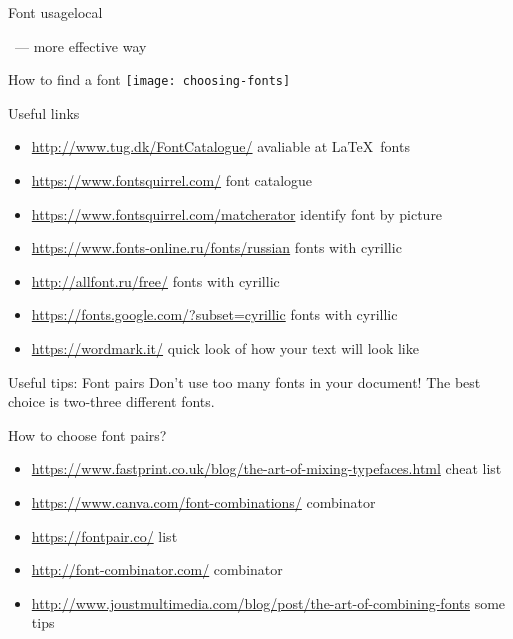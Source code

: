 \begin{frame}[fragile]{Font usage\magicPage}{local}\relax

\ccol\newfontfamily\ --- more effective way


\end{frame}

\begin{frame}{How to find a font}\relax
\centering
     \texttt{[image: choosing-fonts]}
     
\end{frame}

\begin{frame}{Useful links}\relax
\begin{itemize}
    \item {\csk \url{http://www.tug.dk/FontCatalogue/}} avaliable at \LaTeX\ fonts 
    \item {\csk \url{https://www.fontsquirrel.com/}} font catalogue 
    \item {\csk \url{https://www.fontsquirrel.com/matcherator}} identify font by picture
    \item {\csk \url{https://www.fonts-online.ru/fonts/russian}} fonts with cyrillic 
    \item {\csk \url{http://allfont.ru/free/}} fonts with cyrillic 
    \item {\csk \url{https://fonts.google.com/?subset=cyrillic}} fonts with cyrillic
    \item {\csk \url{https://wordmark.it/}} quick look of how your text will look like
     
\end{itemize}
\end{frame}

\begin{frame}{Useful tips: Font pairs}\relax
    Don't use too many fonts in your document! The best choice is two-three different fonts.
    
    How to choose font pairs? 
    
    \begin{itemize}
        \item \url{https://www.fastprint.co.uk/blog/the-art-of-mixing-typefaces.html} cheat list
        \item \url{https://www.canva.com/font-combinations/} combinator
        \item \url{https://fontpair.co/} list 
        \item \url{http://font-combinator.com/} combinator
        \item \url{http://www.joustmultimedia.com/blog/post/the-art-of-combining-fonts} some tips
         
    \end{itemize}
\end{frame}


